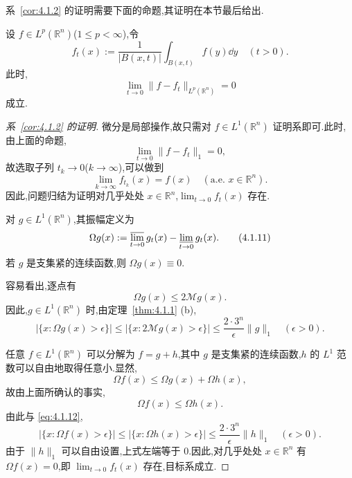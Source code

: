 系~\ref{cor:4.1.2} 的证明需要下面的命题,其证明在本节最后给出.

\begin{proposition}\label{prop:4.1.4}
设 $f \in L^{p}(\mathbb{R}^{n})$($1 \leq p < \infty$),令
\begin{equation*}
f_{t}(x) := \frac{1}{|B(x,t)|}\int_{B(x,t)}f(y)\dd y \quad (t > 0).
\end{equation*}
此时,
\begin{equation*}
\lim_{t \to 0}\|f - f_{t}\|_{L^{p}(\mathbb{R}^{n})} = 0
\end{equation*}
成立.
\end{proposition}

\begin{proof}[系~\ref{cor:4.1.2} 的证明]
微分是局部操作,故只需对 $f \in L^{1}(\mathbb{R}^{n})$ 证明系即可.此时,由上面的命题,
\begin{equation*}
\lim_{t \to 0}\|f - f_{t}\|_{1} = 0,
\end{equation*}
故选取子列 $t_{k} \to 0$($k \to \infty$),可以做到
\begin{equation*}
\lim_{k \to \infty}f_{t_{k}}(x) = f(x) \quad (\text{a.e. } x \in \mathbb{R}^{n}).
\end{equation*}
因此,问题归结为证明对几乎处处 $x \in \mathbb{R}^{n}$,$\lim_{t \to 0}f_{t}(x)$ 存在.

对 $g \in L^{1}(\mathbb{R}^{n})$,其振幅定义为
\begin{equation}
\Omega g(x) := \varlimsup_{t \to 0}g_{t}(x) - \varliminf_{t \to 0}g_{t}(x).\tag{4.1.11}
\label{eq:4.1.11}\end{equation}
若 $g$ 是支集紧的连续函数,则 $\Omega g(x) \equiv 0$.

容易看出,逐点有
\begin{equation*}
\Omega g(x) \leq 2\mathcal{M}g(x).
\end{equation*}
因此,$g \in L^{1}(\mathbb{R}^{n})$ 时,由定理~\ref{thm:4.1.1} (b),
\begin{equation}
|\{x: \Omega g(x) > \epsilon\}| \leq |\{x: 2\mathcal{M}g(x) > \epsilon\}| \leq \frac{2\cdot 3^{n}}{\epsilon}\|g\|_{1} \quad (\epsilon > 0).\tag{4.1.12}
\label{eq:4.1.12}\end{equation}

任意 $f \in L^{1}(\mathbb{R}^{n})$ 可以分解为 $f = g + h$,其中 $g$ 是支集紧的连续函数,$h$ 的 $L^{1}$ 范数可以自由地取得任意小.显然,
\begin{equation*}
\Omega f(x) \leq \Omega g(x) + \Omega h(x),
\end{equation*}
故由上面所确认的事实,
\begin{equation*}
\Omega f(x) \leq \Omega h(x).
\end{equation*}
由此与 \eqref{eq:4.1.12},
\begin{equation*}
|\{x: \Omega f(x) > \epsilon\}| \leq |\{x: \Omega h(x) > \epsilon\}| \leq \frac{2\cdot 3^{n}}{\epsilon}\|h\|_{1} \quad (\epsilon > 0).
\end{equation*}
由于 $\|h\|_{1}$ 可以自由设置,上式左端等于 0.因此,对几乎处处 $x \in \mathbb{R}^{n}$ 有 $\Omega f(x) = 0$,即 $\lim_{t \to 0}f_{t}(x)$ 存在,目标系成立.
\end{proof}

